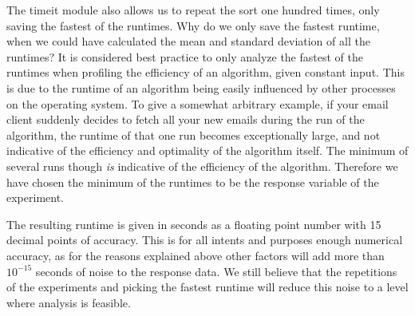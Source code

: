 The timeit module also allows us to repeat the sort one hundred times, only saving the fastest of the runtimes. Why do we only save the fastest runtime, when we could have calculated the mean and standard deviation of all the runtimes? It is considered best practice to only analyze the fastest of the runtimes when profiling the efficiency of an algorithm, given constant input. This is due to the runtime of an algorithm being easily influenced by other processes on the operating system. To give a somewhat arbitrary example, if your email client suddenly decides to fetch all your new emails during the run of the algorithm, the runtime of that one run becomes exceptionally large, and not indicative of the efficiency and optimality of the algorithm itself. The minimum of several runs though \textit{is} indicative of the efficiency of the algorithm. Therefore we have chosen the minimum of the runtimes to be the response variable of the experiment.

The resulting runtime is given in seconds as a floating point number with 15 decimal points of accuracy. This is for all intents and purposes enough numerical accuracy, as for the reasons explained above other factors will add more than $10^{-15}$ seconds of noise to the response data. We still believe that the repetitions of the experiments and picking the fastest runtime will reduce this noise to a level where analysis is feasible.
